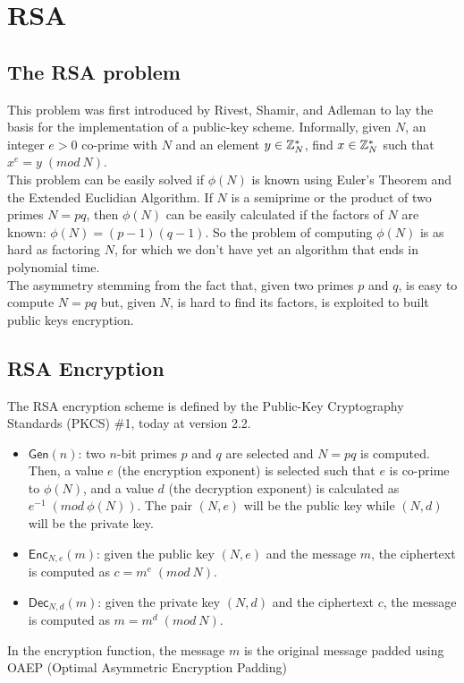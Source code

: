 \section{RSA}
\subsection{The RSA problem}
This problem was first introduced by Rivest, Shamir, and Adleman to lay the basis for the implementation of a public-key scheme. Informally, given $N$, an integer $e > 0$ co-prime with $N$ and an element $y \in \mathbb{Z}_N^{*}$, find $x \in \mathbb{Z}_N^{*}$ such that $x^e = y \; (mod \: N)$.\\
This problem can be easily solved if $\phi(N)$ is known using Euler's Theorem and the Extended Euclidian Algorithm. If $N$ is a semiprime or the product of two primes $N = pq$, then $\phi(N)$ can be easily calculated if the factors of $N$ are known: $\phi(N) = (p-1)(q-1)$. So the problem of computing $\phi(N)$ is as hard as factoring $N$, for which we don't have yet an algorithm that ends in polynomial time.\\
The asymmetry stemming from the fact that, given two primes $p$ and $q$, is easy to compute $N = pq$ but, given $N$, is hard to find its factors, is exploited to built public keys encryption.

\subsection{RSA Encryption}
The RSA encryption scheme is defined by the Public-Key Cryptography Standards (PKCS) \#1, today at version 2.2.
\begin{itemize}
    \item{$\mathsf{Gen}(n)$: two $n$-bit primes $p$ and $q$ are selected and $N = pq$ is computed. Then, a value $e$ (the encryption exponent) is selected such that $e$ is co-prime to $\phi(N)$, and a value $d$ (the decryption exponent) is calculated as $e^{-1} \; (mod \: \phi(N))$. The pair $(N, e)$ will be the public key while $(N, d)$ will be the private key.}
    \item{$\mathsf{Enc}_{N,e}(m)$: given the public key $(N, e)$ and the message $m$, the ciphertext is computed as $c = m^e \; (mod \: N)$.}
    \item{$\mathsf{Dec}_{N,d}(m)$: given the private key $(N, d)$ and the ciphertext $c$, the message is computed as $m = m^d \; (mod \: N)$.}
\end{itemize}
In the encryption function, the message $m$ is the original message padded using OAEP (Optimal Asymmetric Encryption Padding)
